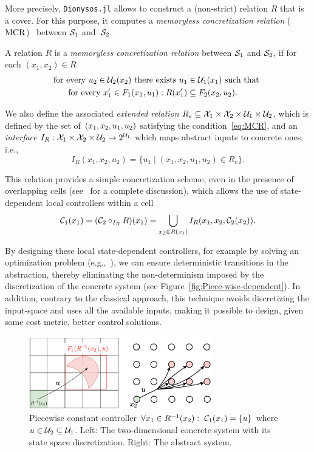 \documentclass{juliacon}
\begin{document}
\vskip 6pt
More precisely, \texttt{Dionysos.jl} allows to construct a (non-strict) relation $R$ that is a cover.
For this purpose, it computes a \emph{memoryless concretization relation} ($\operatorname{MCR}$)~\cite[Definition 8]{Calbert2024a} between $\mathcal{S}_1$ and~$\mathcal{S}_2$.
\begin{defi}
A relation $R$ is a \emph{memoryless concretization relation} between $\mathcal{S}_1$ and $\mathcal{S}_2$, if for each $(x_1,x_2)\in R$ 
\begin{align}\label{eq:MCR}
    & \text{for every } u_2\in \mathcal{U}_2(x_2) \text{ there exists } u_1\in \mathcal{U}_1(x_1) \text{ such that }\nonumber\\
    & \hspace{0.5cm}\text{ for every }x_1'\in F_1(x_1,u_1): R(x_1')\subseteq F_2(x_2,u_2).
\end{align}
\end{defi}
We also define the associated \emph{extended relation} $R_e\subseteq \mathcal{X}_1\times \mathcal{X}_2\times \mathcal{U}_1\times \mathcal{U}_2$, which is defined by the set of $(x_1, x_2, u_1, u_2)$ satisfying the condition~\eqref{eq:MCR}, and an \emph{interface} $I_R:\mathcal{X}_1\times \mathcal{X}_2\times \mathcal{U}_2 \rightarrow 2^{\mathcal{U}_1}$ which maps abstract inputs to concrete ones, i.e., 
$$I_R(x_1, x_2, u_2)= \{u_1 \mid (x_1,x_2,u_1,u_2)\in R_e\}.$$

This relation provides a simple concretization scheme, even in the presence of overlapping cells (see~\cite{Calbert2024a} for a complete discussion), which allows the use of state-dependent local controllers within a cell 
$$\mathcal{C}_1(x_1) = (\mathcal{C}_2\circ_{I_R} R)(x_1) =\bigcup_{x_2\in R(x_1)} I_R(x_1,x_2,\mathcal{C}_2(x_2)).$$


By designing these local state-dependent controllers, for example by solving an optimization problem (e.g.,~\cite[Section V]{calbert2024smart}), we can ensure deterministic transitions in the abstraction, thereby eliminating the non-determinism imposed by the discretization of the concrete system (see Figure~\ref{fig:Piece-wise-dependent}). 
In addition, contrary to the classical approach, this technique avoids discretizing the input-space and uses all the available inputs, making it possible to design, given some cost metric, better control solutions.

\begin{figure}[t]
\centerline{\includegraphics[width=8cm]{Figures/Abstraction/Piece-wise-constant.png}}
\caption{Piecewise constant controller $\forall x_1\in R^{-1}(x_2):\ \mathcal{C}_1(x_1) = \{u\}$ where $u\in \mathcal{U}_2\subseteq \mathcal{U}_1$. 
Left: The two-dimensional concrete system with its state space discretization. Right: The abstract system.}
	\label{fig:Piece-wise-constant}
\end{figure}
\end{document}

